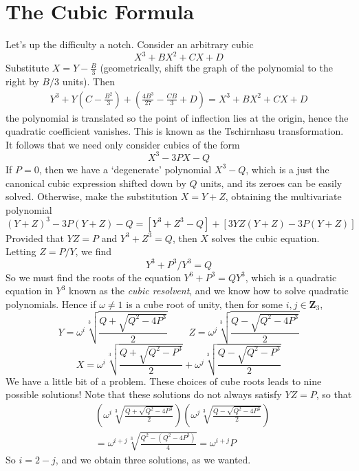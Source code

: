 \section{The Cubic Formula}

Let's up the difficulty a notch. Consider an arbitrary cubic
%
\[ X^3 + BX^2 + CX + D \]
%
Substitute $X = Y - \frac{B}{3}$ (geometrically, shift the graph of the polynomial to the right by $B/3$ units). Then
%
\begin{align*}
   Y^3 + Y\left(C - \frac{B^2}{3}\right) + \left( \frac{4B^3}{27} - \frac{CB}{3} + D \right) = X^3 + BX^2 + CX + D
\end{align*}
%
the polynomial is translated so the point of inflection lies at the origin, hence the quadratic coefficient vanishes. This is known as the Tschirnhasu transformation. It follows that we need only consider cubics of the form
%
\[ X^3 - 3PX - Q \]
%
If $P = 0$, then we have a `degenerate' polynomial $X^3 - Q$, which is a just the canonical cubic expression shifted down by $Q$ units, and its zeroes can be easily solved. Otherwise, make the substitution $X = Y + Z$, obtaining the multivariate polynomial
%
\[ (Y + Z)^3 - 3P(Y + Z) - Q = [Y^3 + Z^3 - Q] + [3YZ(Y + Z) - 3P(Y + Z)] \]
%
Provided that $YZ = P$ and $Y^3 + Z^3 = Q$, then $X$ solves the cubic equation. Letting $Z = P/Y$, we find
%
\[ Y^3 + P^3/Y^3 = Q \]
%
So we must find the roots of the equation $Y^6 + P^3 = QY^3$, which is a quadratic equation in $Y^3$ known as the {\it cubic resolvent}, and we know how to solve quadratic polynomials. Hence if $\omega \neq 1$ is a cube root of unity, then for some $i,j \in \mathbf{Z}_3$,
%
\[ Y = \omega^i \sqrt[3]{\frac{Q + \sqrt{Q^2 - 4P^3}}{2}}\ \ \ \ \ \ \ \ \ \  Z = \omega^j \sqrt[3]{\frac{Q - \sqrt{Q^2 - 4P^3}}{2}} \]
%
\[ X = \omega^i \sqrt[3]{\frac{Q + \sqrt{Q^2 - P^3}}{2}} + \omega^j \sqrt[3]{\frac{Q - \sqrt{Q^2 - P^3}}{2}} \]
%
We have a little bit of a problem. These choices of cube roots leads to nine possible solutions! Note that these solutions do not always satisfy $YZ = P$, so that
%
\begin{align*}
    &\left( \omega^i \sqrt[3]{\frac{Q + \sqrt{Q^2 - 4P^3}}{2}} \right) \left( \omega^j \sqrt[3]{\frac{Q - \sqrt{Q^2 - 4P^3}}{2}} \right)\\
    &= \omega^{i + j} \sqrt[3]{\frac{Q^2-(Q^2 - 4P^3)}{4}} = \omega^{i + j} P
\end{align*}
%
So $i = 2-j$, and we obtain three solutions, as we wanted.

